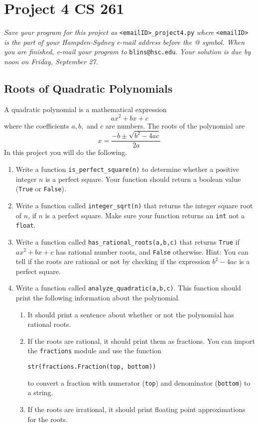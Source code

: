 \documentclass[11pt]{article}
\begin{document}
\section*{Project 4 \hfill CS 261}

\textit{Save your program for this project as} \verb|<emailID>_project4.py| \textit{where} \verb|<emailID>| \textit{is the part of your Hampden-Sydney e-mail address before the @ symbol. When you are finished, e-mail your program to} \verb|blins@hsc.edu|. \textit{Your solution is due by noon on Friday, September 27. }

\subsection*{Roots of Quadratic Polynomials}

A quadratic polynomial is a mathematical expression
$$a x^2 + b x + c$$
where the coefficients $a, b,$ and $c$ are numbers.  The roots of the polynomial are 
$$x = \frac{-b \pm \sqrt{b^2 - 4ac}}{2a}$$
In this project you will do the following. 
\begin{enumerate}
\item Write a function \verb|is_perfect_square(n)| to determine whether a positive integer $n$ is a perfect square.  Your function should return a boolean value (\verb|True| or \verb|False|). 

\item Write a function called \verb|integer_sqrt(n)| that returns the integer square root of $n$, if $n$ is a perfect square.  Make sure your function returns an \verb|int| not a \verb|float|. 

\item Write a function called \verb|has_rational_roots(a,b,c)| that returns \verb|True| if $ax^2 + bx +c$ has rational number roots, and \verb|False| otherwise.  Hint: You can tell if the roots are rational or not by checking if the expression $b^2 - 4ac$ is a perfect square. 

\item Write a function called \verb|analyze_quadratic(a,b,c)|.  This function should print the following information about the polynomial. 

\begin{enumerate}
\item It should print a sentence about whether or not the polynomial has rational roots.

\item If the roots are rational, it should print them as fractions.  You can import the \verb|fractions| module and use the function 
\begin{center}
\verb|str(fractions.Fraction(top, bottom))| 
\end{center}
to convert a fraction with numerator (\verb|top|) and denominator (\verb|bottom|) to a string. 

\item If the roots are irrational, it should print floating point approximations for the roots. 
\end{enumerate}
\end{enumerate}
\end{document}
